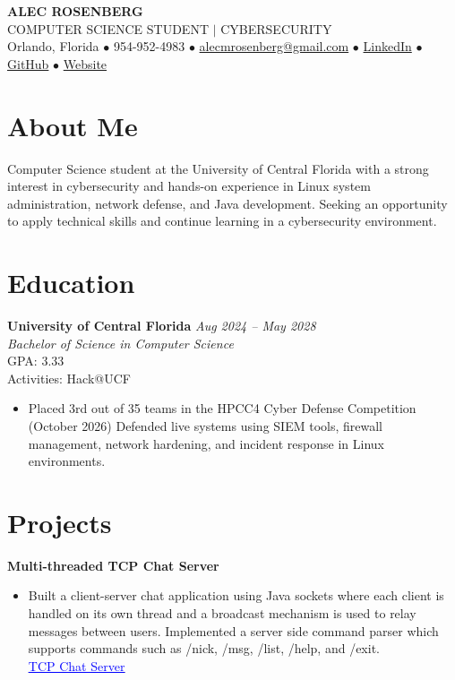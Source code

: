 \documentclass[12pt,letterpaper]{article}
\newcommand{\resumeItem}[1]{\item\small{#1}}
\newcommand{\projectHeading}[2]{\textbf{#1} \hfill \textit{#2}}
\begin{document}
\pagestyle{empty}

\begin{center}
  {\Huge\bfseries ALEC ROSENBERG}\\[4pt]
  {\small COMPUTER SCIENCE STUDENT \(\mid\) CYBERSECURITY}\\[2pt]
  {\small Orlando, Florida \(\bullet\) 954-952-4983 \(\bullet\) \href{mailto:alecmrosenberg@gmail.com}{alecmrosenberg@gmail.com}
  \(\bullet\) \href{https://www.linkedin.com/in/alecmrosenberg/}{LinkedIn} \(\bullet\) \href{https://github.com/alecrosenberg}{GitHub} \(\bullet\) \href{https://alecrosenberg.github.io/}{Website}}
\end{center}

\section{About Me}
\small
Computer Science student at the University of Central Florida with a strong interest in cybersecurity and hands-on experience in Linux system administration, network defense, and Java development. Seeking an opportunity to apply technical skills and continue learning in a cybersecurity environment.

\section{Education}
\noindent
\textbf{University of Central Florida} \hfill \textit{Aug 2024 -- May 2028}\\
\textit{Bachelor of Science in Computer Science}\\[2pt]
GPA: 3.33\\
Activities: Hack@UCF
\begin{itemize}[leftmargin=1.2em,itemsep=1pt,topsep=2pt]
  \resumeItem{Placed 3rd out of 35 teams in the HPCC4 Cyber Defense Competition (October 2026) Defended live systems using SIEM tools, firewall management, network hardening, and incident response in Linux environments.}
\end{itemize}

\section{Projects}
\noindent
\projectHeading{Multi-threaded TCP Chat Server}{}
\begin{itemize}[leftmargin=1.2em,itemsep=1pt,topsep=2pt]
  \resumeItem{Built a client-server chat application using Java sockets where each client is handled on its own thread and a broadcast mechanism is used to relay messages between users. Implemented a server side command parser which supports commands such as /nick, /msg, /list, /help, and /exit. \\} 
  \href{https://github.com/alecrosenberg/Multi-threaded-TCP-Chat-Server}{\textcolor{blue}{\underline{TCP Chat Server}}}
\end{itemize}
\end{document}
